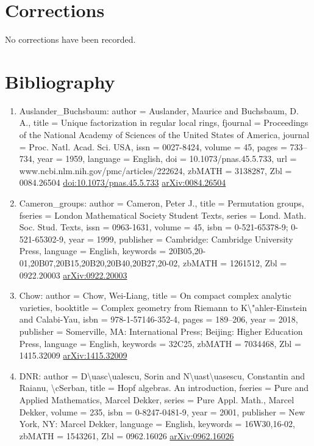 \documentclass[11pt]{article}
\begin{document}
\section*{Corrections}
No corrections have been recorded.

\section*{Bibliography}
\begin{enumerate}[leftmargin=*]
  \item Auslander\_Buchsbaum: author = Auslander, Maurice and Buchsbaum, D. A., title = Unique factorization in regular local rings, fjournal = Proceedings of the National Academy of Sciences of the United States of America, journal = Proc. Natl. Acad. Sci. USA, issn = 0027-8424, volume = 45, pages = 733--734, year = 1959, language = English, doi = 10.1073/pnas.45.5.733, url = www.ncbi.nlm.nih.gov/pmc/articles/222624, zbMATH = 3138287, Zbl = 0084.26504 \href{https://doi.org/10.1073/pnas.45.5.733}{doi:10.1073/pnas.45.5.733} \href{https://arxiv.org/abs/0084.26504}{arXiv:0084.26504}
  \item Cameron\_groups: author = Cameron, Peter J., title = Permutation groups, fseries = London Mathematical Society Student Texts, series = Lond. Math. Soc. Stud. Texts, issn = 0963-1631, volume = 45, isbn = 0-521-65378-9; 0-521-65302-9, year = 1999, publisher = Cambridge: Cambridge University Press, language = English, keywords = 20B05,20-01,20B07,20B15,20B20,20B40,20B27,20-02, zbMATH = 1261512, Zbl = 0922.20003 \href{https://arxiv.org/abs/0922.20003}{arXiv:0922.20003}
  \item Chow: author = Chow, Wei-Liang, title = On compact complex analytic varieties, booktitle = Complex geometry from Riemann to K\textbackslash{}"ahler-Einstein and Calabi-Yau, isbn = 978-1-57146-352-4, pages = 189--206, year = 2018, publisher = Somerville, MA: International Press; Beijing: Higher Education Press, language = English, keywords = 32C25, zbMATH = 7034468, Zbl = 1415.32009 \href{https://arxiv.org/abs/1415.32009}{arXiv:1415.32009}
  \item DNR: author = D\textbackslash{}uasc\textbackslash{}ualescu, Sorin and N\textbackslash{}uast\textbackslash{}uasescu, Constantin and Raianu, \textbackslash{}cSerban, title = Hopf algebras. An introduction, fseries = Pure and Applied Mathematics, Marcel Dekker, series = Pure Appl. Math., Marcel Dekker, volume = 235, isbn = 0-8247-0481-9, year = 2001, publisher = New York, NY: Marcel Dekker, language = English, keywords = 16W30,16-02, zbMATH = 1543261, Zbl = 0962.16026 \href{https://arxiv.org/abs/0962.16026}{arXiv:0962.16026}

\end{enumerate}
\end{document}
